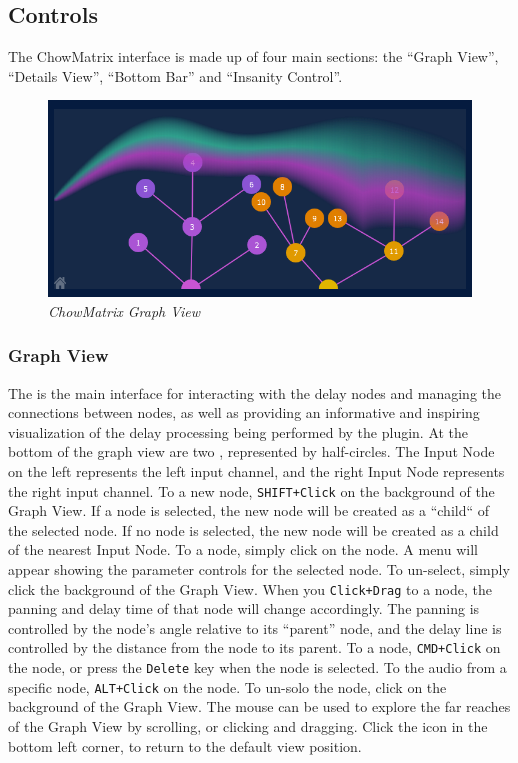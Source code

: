 \documentclass[landscape,twocolumn,a5paper]{manual}
\begin{document}
\subsection{Controls}
The ChowMatrix interface is made up of four main sections:
the ``Graph View'', ``Details View'', ``Bottom Bar''
and ``Insanity Control''.

\begin{figure}[ht]
    \center
    \includegraphics[width=0.8\columnwidth]{screenshots/GraphView.png}
    \caption{\label{fig:graph_view}{\it ChowMatrix Graph View}}
\end{figure}

\subsubsection{Graph View}
The  is the main interface for interacting
with the delay nodes and managing the connections between nodes,
as well as providing an informative and inspiring visualization
of the delay processing being performed by the plugin.
\newpar
At the bottom of the graph view are two ,
represented by half-circles. The Input Node on the left represents
the left input channel, and the right Input Node represents the right
input channel.
\newpar
\hypertarget{goto:add-node}{To } a new
node, \texttt{SHIFT+Click} on the background of the Graph
View. If a node is selected, the new node will be created
as a ``child`` of the selected node. If no node is selected,
the new node will be created as a child of the nearest Input
Node.
\newpar
To  a node, simply click on the node. A menu
will appear showing the parameter controls for the selected node.
To un-select, simply click the background of the Graph View.
\newpar
When you \texttt{Click+Drag} to  a node, the
panning and delay time of that node will change accordingly.
The panning is controlled by the node's angle relative to its
``parent'' node, and the delay line is controlled by the distance
from the node to its parent.
\newpar
\hypertarget{goto:delete-node}{To } a node,
\texttt{CMD+Click} on the node, or press the \texttt{Delete}
key when the node is selected.
\newpar
To  the audio from a specific node,
\texttt{ALT+Click} on the node. To un-solo the node,
click on the background of the Graph View.
\newpar
The mouse can be used to explore the far reaches of the
Graph View by scrolling, or clicking and dragging. Click
the  icon in the bottom left corner, to
return to the default view position.
\end{document}
